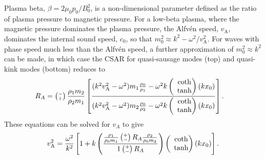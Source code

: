 \documentclass[namedreferences]{solarphysics}
\numberwithin{equation}{section}
\begin{document}
\begin{article}
Plasma beta, $\beta = 2\mu_0p_0/B_0^2$, is a non-dimensional parameter defined as the ratio of plasma pressure to magnetic pressure. For a low-beta plasma, where the magnetic pressure dominates the plasma pressure, the Alfv\'{e}n speed, $v_\textrm{A}$, dominates the internal sound speed, $c_0$, so that $m_0^2 \approx k^2-\omega^2/v_\textrm{A}^2$. For waves with phase speed much less than the Alfv\'{e}n speed, a further approximation of $m_0^2 \approx k^2$ can be made, in which case the CSAR for quasi-sausage modes (top) and quasi-kink modes (bottom) reduces to
\begin{align}
R_A &= \left(\substack{- \\ +}\right) \frac{\rho_1m_2}{\rho_2m_1} \left[ \frac{(k^2v_\textrm{A}^2-\omega^2)m_1\frac{\rho_0}{\rho_1}-\omega^2k \left(\hspace{-0.07in}\begin{matrix} &\coth \\ &\tanh \end{matrix}\right)(kx_0)}{(k^2v_\textrm{A}^2-\omega^2)m_2\frac{\rho_0}{\rho_2}-\omega^2k \left(\hspace{-0.07in}\begin{matrix} &\coth \\ &\tanh \end{matrix}\right)(kx_0)} \right].
\end{align}
These equations can be solved for $v_A$ to give
\begin{equation}
v_\textrm{A}^2 = \frac{\omega^2}{k^2} \left[1 + k \left( \frac{ \frac{\rho_1}{\rho_0m_1} \left(\substack{+ \\ -}\right) R_A\frac{\rho_2}{\rho_0m_2}}{1 \left(\substack{+ \\ -}\right) R_A} \right) \left(\hspace{-0.07in}\begin{matrix} &\coth \\ &\tanh \end{matrix}\right) (kx_0)\right].
\end{equation}




\end{article}
\end{document}
